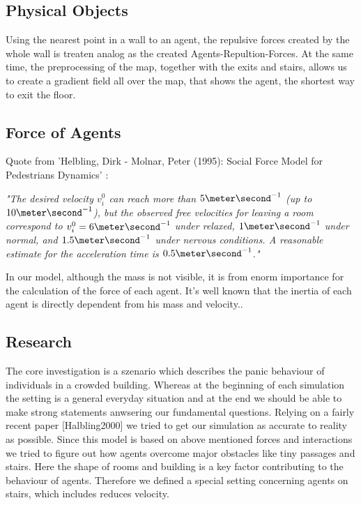 \documentclass[11pt]{article}
\begin{document}
\subsection*{Physical Objects}

Using the nearest point in a wall to an agent, the repulsive forces created by the whole wall is treaten analog as the created Agents-Repultion-Forces. At the same time, the preprocessing of the map, together with the exits and stairs, allows us to create a gradient field all over the map, that shows the agent, the shortest way to exit the floor. 



\subsection*{Force of Agents}

Quote from 'Helbling, Dirk - Molnar, Peter (1995): Social Force Model for Pedestrians Dynamics' \cite{SFMPD} :

\textit{"The desired velocity $v^0_i$ can reach more than $5 \meter\second^{-1}$ (up to $10 \meter\second^{-1}$), but the observed free velocities	for	leaving	a	room	correspond	to	$v^0_i=6 \meter\second^{-1}$ under relaxed, $1\meter\second^{-1}$ under normal, and $1.5\meter\second^{-1}$ under nervous conditions. A reasonable estimate for the acceleration time is $0.5\meter\second^{-1}$."}

In our model, although the mass is not visible, it is from enorm importance for the calculation of the force of each agent. It's well known that the inertia of each agent is directly dependent from his mass and velocity..



\subsection{Research}

The core investigation is a szenario which describes the panic behaviour of individuals in a crowded building. Whereas at the beginning of each simulation the setting is a general everyday situation and at the end we should be able to make strong statements anwsering our fundamental questions.
Relying on a fairly recent paper [Halbling2000] we tried to get our simulation as accurate to reality as possible. Since this model is based on above mentioned forces and interactions we tried to figure out how agents overcome major obstacles like tiny passages and stairs. Here the shape of rooms and building is a key factor contributing to the behaviour of agents.
Therefore we defined a special setting concerning agents on stairs, which includes reduces velocity.
\end{document}
